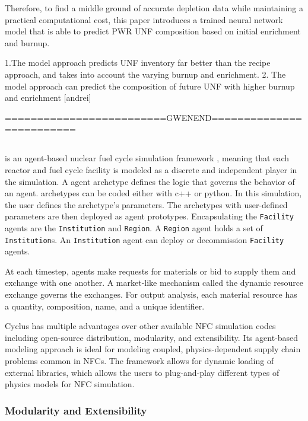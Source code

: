 Therefore, to find a middle ground of accurate depletion data while 
maintaining a practical computational cost, this paper introduces 
a trained neural network model that is able to predict \gls{PWR} \gls{UNF}
composition based on initial enrichment and burnup. 


1.The model approach predicts \gls{UNF} inventory far better than
the recipe approach, and takes into account the varying burnup and
enrichment.
2. The model approach can predict the composition of future
\gls{UNF} with higher burnup and enrichment [andrei]

=========================GWENEND=========================

\subsection{\Cyclus}

\Cyclus is an agent-based nuclear fuel cycle simulation framework 
\cite{huff_fundamental_2016}, meaning
that each reactor and fuel cycle facility is modeled as a discrete and independent
player in the simulation.
A \Cyclus agent archetype defines the logic that governs the behavior
of an agent. 
\Cyclus archetypes can be coded either with c++ or python.
In this simulation, the user defines the archetype's
parameters. The archetypes with user-defined parameters are then deployed
as agent prototypes.  Encapsulating the \texttt{Facility} agents are the \texttt{Institution} and \texttt{Region}.
A \texttt{Region} agent holds a set of \texttt{Institution}s. 
An \texttt{Institution} agent can deploy or decommission \texttt{Facility} agents.

At each timestep,
agents make requests for materials or bid to supply them and exchange
with one another. A market-like mechanism called the dynamic resource exchange
\cite{gidden_methodology_2016} governs the exchanges.
For output analysis, each material resource has a quantity, composition, name, and a unique identifier.

Cyclus has multiple advantages over other available
\gls{NFC} simulation codes including open-source distribution, modularity,
and extensibility. Its agent-based modeling approach
is ideal for modeling coupled, physics-dependent
supply chain problems common in \glspl{NFC}.
The framework allows for dynamic loading of 
external libraries, which allows the users to plug-and-play
different types of physics models for \gls{NFC}
simulation.


\subsubsection{Modularity and Extensibility}

